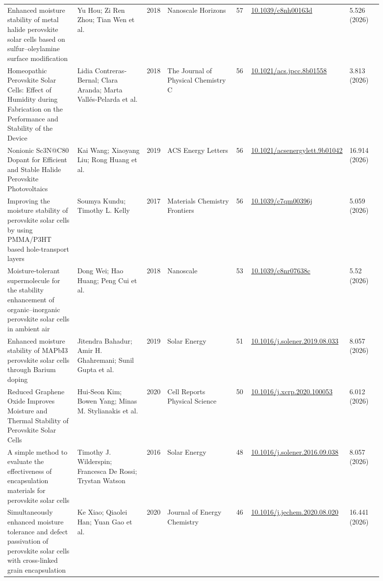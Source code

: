 \documentclass[10pt,a4paper]{article}
\begin{document}
{\begin{longtable}{p{0.197\linewidth}p{0.197\linewidth}p{0.043\linewidth}p{0.197\linewidth}p{0.043\linewidth}p{0.117\linewidth}p{0.098\linewidth}}
Enhanced moisture stability of metal halide perovskite solar cells based on sulfur–oleylamine surface modification & Yu Hou; Zi Ren Zhou; Tian Wen et al. & 2018 & Nanoscale Horizons & 57 & \href{https://doi.org/10.1039/c8nh00163d}{10.1039/c8nh00163d} & 5.526 (2026) \\
Homeopathic Perovskite Solar Cells: Effect of Humidity during Fabrication on the Performance and Stability of the Device & Lidia Contreras‐Bernal; Clara Aranda; Marta Vallés‐Pelarda et al. & 2018 & The Journal of Physical Chemistry C & 56 & \href{https://doi.org/10.1021/acs.jpcc.8b01558}{10.1021/acs.jpcc.8b01558} & 3.813 (2026) \\
Nonionic Sc3N@C80 Dopant for Efficient and Stable Halide Perovskite Photovoltaics & Kai Wang; Xiaoyang Liu; Rong Huang et al. & 2019 & ACS Energy Letters & 56 & \href{https://doi.org/10.1021/acsenergylett.9b01042}{10.1021/acsenergylett.9b01042} & 16.914 (2026) \\
Improving the moisture stability of perovskite solar cells by using PMMA/P3HT based hole-transport layers & Soumya Kundu; Timothy L. Kelly & 2017 & Materials Chemistry Frontiers & 56 & \href{https://doi.org/10.1039/c7qm00396j}{10.1039/c7qm00396j} & 5.059 (2026) \\
Moisture-tolerant supermolecule for the stability enhancement of organic–inorganic perovskite solar cells in ambient air & Dong Wei; Hao Huang; Peng Cui et al. & 2018 & Nanoscale & 53 & \href{https://doi.org/10.1039/c8nr07638c}{10.1039/c8nr07638c} & 5.52 (2026) \\
Enhanced moisture stability of MAPbI3 perovskite solar cells through Barium doping & Jitendra Bahadur; Amir H. Ghahremani; Sunil Gupta et al. & 2019 & Solar Energy & 51 & \href{https://doi.org/10.1016/j.solener.2019.08.033}{10.1016/j.solener.2019.08.033} & 8.057 (2026) \\
Reduced Graphene Oxide Improves Moisture and Thermal Stability of Perovskite Solar Cells & Hui‐Seon Kim; Bowen Yang; Minas Μ. Stylianakis et al. & 2020 & Cell Reports Physical Science & 50 & \href{https://doi.org/10.1016/j.xcrp.2020.100053}{10.1016/j.xcrp.2020.100053} & 6.012 (2026) \\
A simple method to evaluate the effectiveness of encapsulation materials for perovskite solar cells & Timothy J. Wilderspin; Francesca De Rossi; Trystan Watson & 2016 & Solar Energy & 48 & \href{https://doi.org/10.1016/j.solener.2016.09.038}{10.1016/j.solener.2016.09.038} & 8.057 (2026) \\
Simultaneously enhanced moisture tolerance and defect passivation of perovskite solar cells with cross-linked grain encapsulation & Ke Xiao; Qiaolei Han; Yuan Gao et al. & 2020 & Journal of Energy Chemistry & 46 & \href{https://doi.org/10.1016/j.jechem.2020.08.020}{10.1016/j.jechem.2020.08.020} & 16.441 (2026) \\

\end{longtable}}
\end{document}
